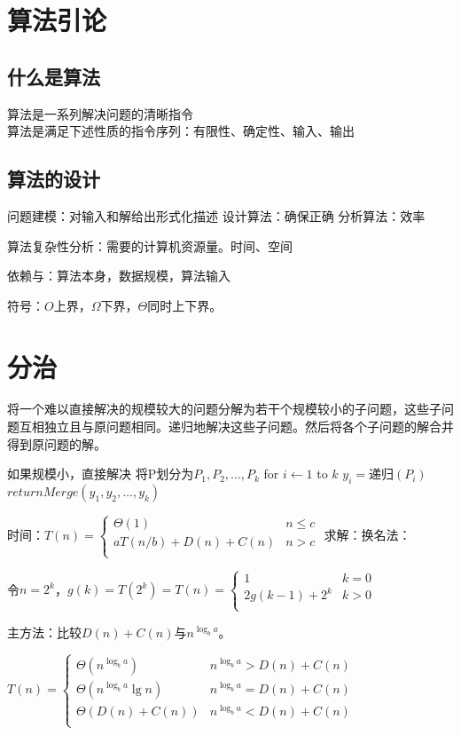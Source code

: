 \documentclass[twocolumn,zihao=5,linespread=1,heading=false,autoindent=0pt]{ctexart}
\theoremstyle{exampstyle} \newtheorem{definition}{定义}[section]
\theoremstyle{exampstyle} \newtheorem{example}{例}[section]
\theoremstyle{exampstyle} \newtheorem{theorem}{定理}[section]
\theoremstyle{exampstyle} \newtheorem{lemma}{引理}[section]
\theoremstyle{exampstyle} \newtheorem{myproof}{证明}[section]
\begin{document}
\scriptsize
\section{算法引论}
\subsection{什么是算法}
算法是一系列解决问题的清晰指令\\
算法是满足下述性质的指令序列：有限性、确定性、输入、输出
\subsection{算法的设计}
\begin{outline}[citemize]
    \1 问题建模：对输入和解给出形式化描述
    \1 设计算法：确保正确
    \1 分析算法：效率
\end{outline}
算法复杂性分析：需要的计算机资源量。时间、空间

依赖与：算法本身，数据规模，算法输入

符号：$O$上界，$\Omega$下界，$\Theta$同时上下界。
\section{分治}
将一个难以直接解决的规模较大的问题分解为若干个规模较小的子问题，这些子问题互相独立且与原问题相同。递归地解决这些子问题。然后将各个子问题的解合并得到原问题的解。

\begin{outline}[citemize]
    \1 如果规模小，直接解决
    \1 将P划分为$P_1,  P_2, \dots, P_k$
    \1 for $i \gets 1$ to $k$
        \2 $y_i = $递归$(P_i)$
    \1 $return Merge(y_1, y_2, \dots, y_k)$
\end{outline}

时间：$T(n) = \begin{cases}
    \Theta(1) & n \le c \\
    aT(n/b) + D(n) + C(n) & n > c \\
\end{cases}$
求解：换名法：

令$ n = 2^k$，$g(k) = T(2^k) = T(n) =  \begin{cases}
    1 & k = 0 \\
    2g(k - 1) + 2^k & k > 0 \\
\end{cases}$

主方法：比较$D(n) + C(n)$与$n^{\log_ba}$。

$T(n) = \begin{cases}
    \Theta(n^{\log_ba}) & n^{\log_ba} > D(n) + C(n) \\
    \Theta(n^{\log_ba} \lg n) & n^{\log_ba} = D(n) + C(n) \\
    \Theta(D(n) + C(n)) & n^{\log_ba} < D(n) + C(n) \\
\end{cases}$
\end{document}
